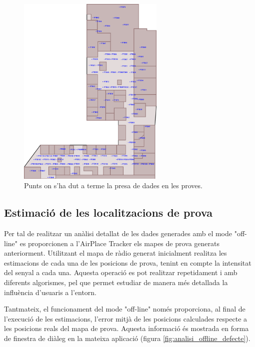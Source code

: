 \begin{figure}[ht]
\begin{center}
\includegraphics[width=7cm]{imatges/planol_proves.png}
\caption{Punts on s'ha dut a terme la presa de dades en les proves.}
\label{fig:planol_proves}
\end{center}
\end{figure}

\subsection{Estimació de les localitzacions de prova}

Per tal de realitzar un anàlisi detallat de les dades generades amb el mode "off-line" es proporcionen a l'AirPlace Tracker els mapes de prova generats anteriorment. Utilitzant el mapa de ràdio generat inicialment realitza les estimacions de cada una de les posicions de prova, tenint en compte la intensitat del senyal a cada una. Aquesta operació es pot realitzar repetidament i amb diferents algorismes, pel que permet estudiar de manera més detallada la influència d'usuaris a l'entorn.

Tantmateix, el funcionament del mode "off-line" només proporciona, al final de l'execució de les estimacions, l'error mitjà de les posicions calculades respecte a les posicions reals del mapa de prova. Aquesta informació és mostrada en forma de finestra de diàleg en la mateixa aplicació (figura \ref{fig:analisi_offline_defecte}).

